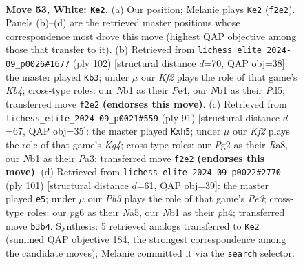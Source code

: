 \documentclass[11pt]{article}
\begin{document}
\clearpage

\begin{figure}[p]\centering
\begin{subfigure}{0.46\textwidth}\centering
\resizebox{\linewidth}{!}{%
\newchessgame
\chessboard[
  setfen={5k2/5p1p/1n4p1/p3p1P1/P3P3/1P4RP/5KP1/RN1r3r w - - 20 53},
  showmover=false,
  pgfstyle=straightmove, color=movearrow, markmove={f2-e2}
]}
\caption{}
\end{subfigure}\hfill
\begin{subfigure}{0.46\textwidth}\centering
\resizebox{\linewidth}{!}{%
\newchessgame
\chessboard[
  setfen={2r5/6p1/1p1k1p2/1P1Pr2p/1K2P3/6P1/3RR1P1/8 w - - 12 52},
  showmover=false,
  pgfstyle=straightmove, color=movearrow, markmove={b4-b3}
]}
\caption{}
\end{subfigure}
\\[4pt]
\begin{subfigure}{0.46\textwidth}\centering
\resizebox{\linewidth}{!}{%
\newchessgame
\chessboard[
  setfen={r7/5pp1/r3p2p/3p2kP/3P4/p3P1K1/R4P2/R7 b - - 1 46},
  showmover=false,
  pgfstyle=straightmove, color=movearrow, markmove={g5-h5}
]}
\caption{}
\end{subfigure}\hfill
\begin{subfigure}{0.46\textwidth}\centering
\resizebox{\linewidth}{!}{%
\newchessgame
\chessboard[
  setfen={3rk3/2Rp4/1P2p1Np/n1P2p1r/5p1P/5P2/5K2/7R b - - 0 51},
  showmover=false,
  pgfstyle=straightmove, color=movearrow, markmove={e6-e5}
]}
\caption{}
\end{subfigure}
\caption{\textbf{Move 53, White: \texttt{Ke2}.} (a) Our position; Melanie plays \texttt{Ke2} (\texttt{f2e2}). Panels (b)--(d) are the retrieved master positions whose correspondence most drove this move (highest QAP objective among those that transfer to it). (b) Retrieved from \texttt{lichess\_elite\_2024-09\_p0026\#1677} (ply 102) [structural distance $d$=70, QAP obj=38]: the master played \texttt{Kb3}; under $\mu$ our \emph{Kf2} plays the role of that game's \emph{Kb4}; cross-type roles: our \emph{N}b1 as their \emph{P}e4, our \emph{N}b1 as their \emph{P}d5; transferred move \texttt{f2e2} \textbf{(endorses this move)}. (c) Retrieved from \texttt{lichess\_elite\_2024-09\_p0021\#559} (ply 91) [structural distance $d$=67, QAP obj=35]: the master played \texttt{Kxh5}; under $\mu$ our \emph{Kf2} plays the role of that game's \emph{Kg4}; cross-type roles: our \emph{P}g2 as their \emph{R}a8, our \emph{N}b1 as their \emph{P}a3; transferred move \texttt{f2e2} \textbf{(endorses this move)}. (d) Retrieved from \texttt{lichess\_elite\_2024-09\_p0022\#2770} (ply 101) [structural distance $d$=61, QAP obj=39]: the master played \texttt{e5}; under $\mu$ our \emph{Pb3} plays the role of that game's \emph{Pe3}; cross-type roles: our \emph{p}g6 as their \emph{N}a5, our \emph{N}b1 as their \emph{p}h4; transferred move \texttt{b3b4}. Synthesis: 5 retrieved analogs transferred to \texttt{Ke2} (summed QAP objective 184, the strongest correspondence among the candidate moves); Melanie committed it via the \texttt{search} selector.}
\label{fig:thought-m104}
\end{figure}
\end{document}
